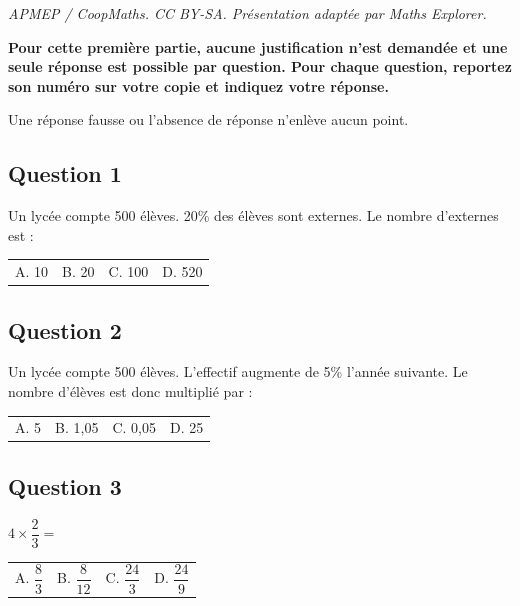 \documentclass[10pt]{article}
\begin{document}
\noindent\textit{APMEP / CoopMaths. CC BY-SA. Présentation adaptée par Maths Explorer.}\par\medskip
\textbf{Pour cette première partie, aucune justification n'est demandée et une seule réponse est possible par question. Pour chaque question, reportez son numéro sur votre copie et indiquez votre réponse.}\par
Une réponse fausse ou l'absence de réponse n'enlève aucun point.

\vspace{.8em}

\subsection*{Question 1}

Un lycée compte 500 élèves. 20\% des élèves sont externes. Le nombre d'externes est :
\begin{center}
\begin{tabularx}{.92\linewidth}{XXXX} A. 10 & B. 20 & C. 100 & D. 520\end{tabularx}\end{center}

\vspace{.8em}

\subsection*{Question 2}

Un lycée compte 500 élèves. L'effectif augmente de 5\% l'année suivante. Le nombre d'élèves est donc multiplié par :
\begin{center}
\begin{tabularx}{.92\linewidth}{XXXX} A. 5 & B. 1,05 & C. 0,05 & D. 25\end{tabularx}
\end{center}

\vspace{.8em}

\subsection*{Question 3}

$4\times\dfrac{2}{3}=$
\begin{center}
\begin{tabularx}{.92\linewidth}{XXXX} A. $\dfrac{8}{3}$ & B. $\dfrac{8}{12}$ & C. $\dfrac{24}{3}$ & D. $\dfrac{24}{9}$\end{tabularx}
\end{center}
\end{document}
